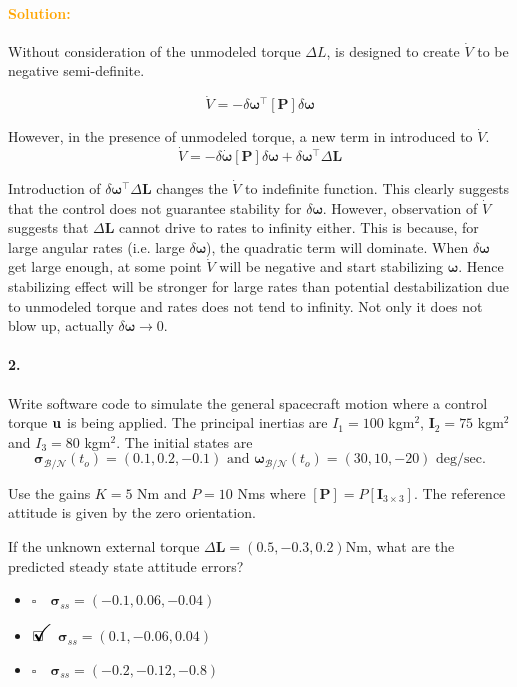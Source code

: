 \documentclass[12pt, a4paper]{article}
\newcommand{\ans}{\item[]$\rlap{\LARGE{\checkmark}}\square\quad$}
\newcommand{\noans}{\item[]$\square\quad$}
\begin{document}
\paragraph{\textcolor{orange}{Solution:}} Without consideration of the unmodeled torque $\Delta L$, is designed to create $\dot{V}$ to be negative semi-definite.

$$
\dot{V} = - \delta\bm{\omega}^{\intercal}[\bm{P}]\delta\bm{\omega}
$$

However, in the presence of unmodeled torque, a new term in introduced to $\dot{V}$. 
$$
\dot{V} = - \delta\dot{\bm{\omega}}[\bm{P}]\delta\bm{\omega} + \delta\bm{\omega}^{\intercal}\Delta \bm{L}
$$

Introduction of  $\delta\bm{\omega}^{\intercal}\Delta\bm{L}$ changes the $\dot{V}$ to indefinite function. This clearly suggests that the control does not guarantee stability for $\delta\bm{\omega}$. However, observation of $\dot{V}$ suggests that $\Delta\bm{L}$ cannot drive to rates to infinity either. This is because, for large angular rates (i.e. large $\delta\bm{\omega}$), the quadratic term will dominate. When $\delta\bm{\omega}$ get large enough, at some point $\dot{V}$ will be negative and start stabilizing $\bm{\omega}$. Hence stabilizing effect will be stronger for large rates than potential destabilization due to  unmodeled torque and rates does not tend to infinity. Not only it does not blow up, actually $\delta\bm{\omega}\rightarrow0$.

\paragraph{2.}
Write software code to simulate the general spacecraft motion where a control torque $\bf{u}$ is being applied. The principal inertias are $I_{1} = 100$ kgm$^{2}$, $\bm{I}_{2} = 75$ kgm$^{2}$ and $I_{3} = 80$ kgm$^{2}$. The initial states are
$$\bm{\sigma}_{\mathcal{B}/\mathcal{N}}(t_{o}) = (0.1,0.2,-0.1)\text{ and }\bm{\omega}_{\mathcal{B}/\mathcal{N}}(t_{o}) = (30,10,-20) \text{ deg/sec.}$$

Use the gains $K = 5$ Nm and $P = 10$ Nms where $[\bm{P}] = P [\bm{I}_{3\times3}]$. The reference attitude is given by the zero orientation.

If the unknown external torque $\Delta \bm{L} = (0.5,-0.3,0.2)$Nm, what are the predicted steady state attitude errors?

\begin{itemize}
\noans $\bm{\sigma}_{ss} = (-0.1,0.06,-0.04)$
\ans $\bm{\sigma}_{ss} = (0.1,-0.06,0.04)$
\noans $\bm{\sigma}_{ss} = (-0.2,-0.12,-0.8)$
\end{itemize}
\end{document}
